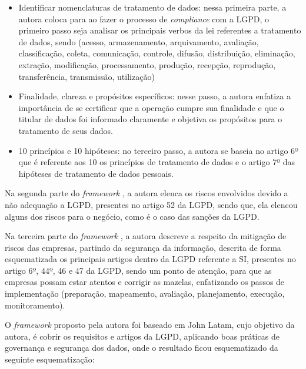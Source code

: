 \documentclass[
	12pt,				%
	openright,			%
	oneside,			%
	a4paper,			%
	english,			%
	french,				%
	spanish,			%
	brazil,				%
	]{abntex2}
\begin{document}
\begin{itemize}
\item Identificar nomenclaturas de tratamento de dados: nessa primeira parte, a autora coloca para ao fazer o processo de \textit{compliance} com a LGPD, o primeiro passo seja analisar os principais verbos da lei referentes a tratamento de dados, sendo (acesso, armazenamento, arquivamento, avaliação, classificação, coleta, comunicação, controle, difusão, distribuição, eliminação, extração, modificação, processamento, produção, recepção, reprodução, transferência, transmissão, utilização)
\item Finalidade, clareza e propósitos específicos: nesse passo, a autora enfatiza a importância de se certificar que a operação cumpre sua finalidade e que o titular de dados foi informado claramente e objetiva os propósitos para o tratamento de seus dados.
\item 10 princípios e 10 hipóteses: no terceiro passo, a autora se baseia no artigo 6º que é referente aos 10 os princípios de tratamento de dados e o artigo 7º das hipóteses de tratamento de dados pessoais.
\end{itemize}

Na segunda parte do \textit{framework} , a autora elenca os riscos envolvidos devido a não adequação a LGPD, presentes no artigo 52 da LGPD, sendo que, ela elencou alguns dos riscos para o negócio, como é o caso das sanções da LGPD.

Na terceira parte do \textit{framework} , a autora descreve a respeito da mitigação de riscos das empresas, partindo da segurança da informação, descrita de forma esquematizada os principais artigos dentro da LGPD referente a SI, presentes no artigo 6º, 44º, 46 e 47 da LGPD, sendo um ponto de atenção, para que as empresas possam estar atentos e corrigir as mazelas, enfatizando os passos de implementação (preparação, mapeamento, avaliação, planejamento, execução, monitoramento).

O \textit{framework}  proposto pela autora foi baseado em John Latam, cujo objetivo da autora, é cobrir os requisitos e artigos da LGPD, aplicando boas práticas de governança e segurança dos dados, onde o resultado ficou esquematizado da seguinte esquematização:
\end{document}
